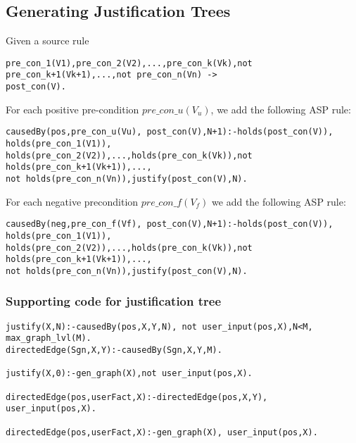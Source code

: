 \documentclass{article}
\begin{document}
\subsection{Generating Justification Trees}
Given a source rule \begin{verbatim}
pre_con_1(V1),pre_con_2(V2),...,pre_con_k(Vk),not pre_con_k+1(Vk+1),...,not pre_con_n(Vn) -> 
post_con(V).
\end{verbatim}
For each positive pre-condition $pre\_con\_u(V_{u})$, we add the following ASP rule:
\begin{verbatim}
causedBy(pos,pre_con_u(Vu), post_con(V),N+1):-holds(post_con(V)), holds(pre_con_1(V1)),
holds(pre_con_2(V2)),...,holds(pre_con_k(Vk)),not holds(pre_con_k+1(Vk+1)),...,
not holds(pre_con_n(Vn)),justify(post_con(V),N).   
\end{verbatim}
For each negative precondition $pre\_con\_f(V_{f})$ we add the following ASP rule:
\begin{verbatim}
causedBy(neg,pre_con_f(Vf), post_con(V),N+1):-holds(post_con(V)), holds(pre_con_1(V1)),
holds(pre_con_2(V2)),...,holds(pre_con_k(Vk)),not holds(pre_con_k+1(Vk+1)),...,
not holds(pre_con_n(Vn)),justify(post_con(V),N).   
\end{verbatim}
\subsubsection{Supporting code for justification tree}
\begin{verbatim}
justify(X,N):-causedBy(pos,X,Y,N), not user_input(pos,X),N<M, max_graph_lvl(M).
directedEdge(Sgn,X,Y):-causedBy(Sgn,X,Y,M).

justify(X,0):-gen_graph(X),not user_input(pos,X).

directedEdge(pos,userFact,X):-directedEdge(pos,X,Y), user_input(pos,X).

directedEdge(pos,userFact,X):-gen_graph(X), user_input(pos,X).

\end{verbatim}
\end{document}

